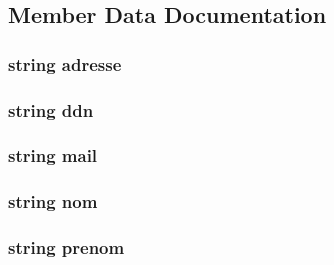 \subsection{Member Data Documentation}
\hypertarget{classEleve_a14f872fc950333bc99e8fbe114aa61a1}{
\subsubsection[{adresse}]{\setlength{\rightskip}{0pt plus 5cm}string adresse\hspace{0.3cm}{\ttfamily [private]}}}\label{classEleve_a14f872fc950333bc99e8fbe114aa61a1}
\hypertarget{classEleve_aef927bb2f0e5cb17c6b561a6c36ee5cd}{
\subsubsection[{ddn}]{\setlength{\rightskip}{0pt plus 5cm}string ddn\hspace{0.3cm}{\ttfamily [private]}}}\label{classEleve_aef927bb2f0e5cb17c6b561a6c36ee5cd}
\hypertarget{classEleve_a265105fe7abcb70d0eec06f251ddd1b9}{
\subsubsection[{mail}]{\setlength{\rightskip}{0pt plus 5cm}string mail\hspace{0.3cm}{\ttfamily [private]}}}\label{classEleve_a265105fe7abcb70d0eec06f251ddd1b9}
\hypertarget{classEleve_a9d2382d2839a53d9cb3d77f1712a7f74}{
\subsubsection[{nom}]{\setlength{\rightskip}{0pt plus 5cm}string nom\hspace{0.3cm}{\ttfamily [private]}}}\label{classEleve_a9d2382d2839a53d9cb3d77f1712a7f74}
\hypertarget{classEleve_a2fa7f2d2346b55554e45563b80ed1065}{
\subsubsection[{prenom}]{\setlength{\rightskip}{0pt plus 5cm}string prenom\hspace{0.3cm}{\ttfamily [private]}}}\label{classEleve_a2fa7f2d2346b55554e45563b80ed1065}
